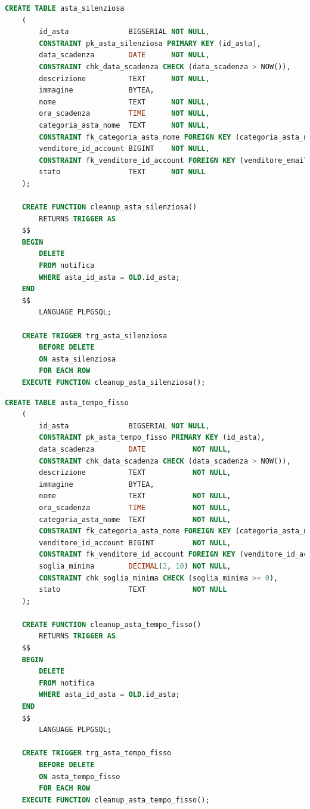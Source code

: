 \begin{lstlisting}[language=SQL, caption=Relazione asta silenziosa]
    CREATE TABLE asta_silenziosa
    (
        id_asta              BIGSERIAL NOT NULL,
        CONSTRAINT pk_asta_silenziosa PRIMARY KEY (id_asta),
        data_scadenza        DATE      NOT NULL,
        CONSTRAINT chk_data_scadenza CHECK (data_scadenza > NOW()),
        descrizione          TEXT      NOT NULL,
        immagine             BYTEA,
        nome                 TEXT      NOT NULL,
        ora_scadenza         TIME      NOT NULL,
        categoria_asta_nome  TEXT      NOT NULL,
        CONSTRAINT fk_categoria_asta_nome FOREIGN KEY (categoria_asta_nome) REFERENCES categoria_asta (nome) ON UPDATE CASCADE ON DELETE CASCADE,
        venditore_id_account BIGINT    NOT NULL,
        CONSTRAINT fk_venditore_id_account FOREIGN KEY (venditore_email) REFERENCES venditore (id_account) ON UPDATE CASCADE ON DELETE CASCADE,
        stato                TEXT      NOT NULL
    );
    
    CREATE FUNCTION cleanup_asta_silenziosa()
        RETURNS TRIGGER AS
    $$
    BEGIN
        DELETE
        FROM notifica
        WHERE asta_id_asta = OLD.id_asta;
    END
    $$
        LANGUAGE PLPGSQL;
    
    CREATE TRIGGER trg_asta_silenziosa
        BEFORE DELETE
        ON asta_silenziosa
        FOR EACH ROW
    EXECUTE FUNCTION cleanup_asta_silenziosa();
\end{lstlisting}

\begin{lstlisting}[language=SQL, caption=Relazione asta a tempo fisso]
    CREATE TABLE asta_tempo_fisso
    (
        id_asta              BIGSERIAL NOT NULL,
        CONSTRAINT pk_asta_tempo_fisso PRIMARY KEY (id_asta),
        data_scadenza        DATE           NOT NULL,
        CONSTRAINT chk_data_scadenza CHECK (data_scadenza > NOW()),
        descrizione          TEXT           NOT NULL,
        immagine             BYTEA,
        nome                 TEXT           NOT NULL,
        ora_scadenza         TIME           NOT NULL,
        categoria_asta_nome  TEXT           NOT NULL,
        CONSTRAINT fk_categoria_asta_nome FOREIGN KEY (categoria_asta_nome) REFERENCES categoria_asta (nome) ON UPDATE CASCADE ON DELETE CASCADE,
        venditore_id_account BIGINT         NOT NULL,
        CONSTRAINT fk_venditore_id_account FOREIGN KEY (venditore_id_account) REFERENCES venditore (id_account) ON UPDATE CASCADE ON DELETE CASCADE,
        soglia_minima        DECIMAL(2, 10) NOT NULL,
        CONSTRAINT chk_soglia_minima CHECK (soglia_minima >= 0),
        stato                TEXT           NOT NULL
    );
    
    CREATE FUNCTION cleanup_asta_tempo_fisso()
        RETURNS TRIGGER AS
    $$
    BEGIN
        DELETE
        FROM notifica
        WHERE asta_id_asta = OLD.id_asta;
    END
    $$
        LANGUAGE PLPGSQL;
    
    CREATE TRIGGER trg_asta_tempo_fisso
        BEFORE DELETE
        ON asta_tempo_fisso
        FOR EACH ROW
    EXECUTE FUNCTION cleanup_asta_tempo_fisso();
\end{lstlisting}

